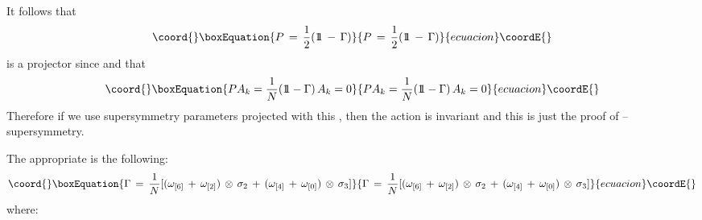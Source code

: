 \documentclass[a4paper,11pt]{article}
\begin{document}
It follows that
\begin{equation}\coord{}\boxEquation{
P \, = \, \frac{1}{2} ( 1 \! \!  1 \, - \, \Gamma)
\label{proyector}
}{
P \, = \, \frac{1}{2} ( 1 \! \!  1 \, - \, \Gamma)
}{ecuacion}\coordE{}\end{equation}
is a projector since \coordHE{} and that
\begin{equation}\coord{}\boxEquation{
P A_{k} = \frac{1}{N}(1 \! \! 1 - \Gamma) \, A_{k} = 0
\label{k supersi pro}
}{
P A_{k} = \frac{1}{N}(1 \! \! 1 - \Gamma) \, A_{k} = 0
}{ecuacion}\coordE{}\end{equation}
Therefore if we use supersymmetry parameters \coordHE{} projected with this \coordHE{}, then the
action is invariant and this is just the proof of
\myHighlight{$\kappa$}\coordHE{}--supersymmetry.
\par
The appropriate \myHighlight{$ \Gamma $}\coordHE{} is the following:
\begin{equation}\coord{}\boxEquation{
\Gamma \, = \, \frac{1}{N} [(\omega_{[6]} \, + \, \omega_{[2]}) \, \otimes \,
\sigma_{2} \, + \, (\omega_{[4]} \, + \, \omega_{[0]}) \, \otimes \, \sigma_{3}]
\label{def gamma}
}{
\Gamma \, = \, \frac{1}{N} [(\omega_{[6]} \, + \, \omega_{[2]}) \, \otimes \,
\sigma_{2} \, + \, (\omega_{[4]} \, + \, \omega_{[0]}) \, \otimes \, \sigma_{3}]
}{ecuacion}\coordE{}\end{equation}
where:
\end{document}
